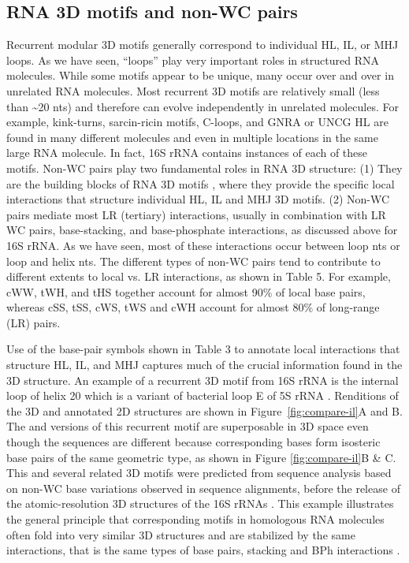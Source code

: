 \subsection{RNA 3D motifs and non-WC pairs}

Recurrent modular 3D motifs generally correspond to individual HL, IL, or MHJ
loops. As we have seen, ``loops'' play very important roles in structured RNA
molecules. While some motifs appear to be unique, many occur over and over in
unrelated RNA molecules. Most recurrent 3D motifs are relatively small (less
than \textasciitilde 20 nts) and therefore can evolve independently in unrelated molecules.
For example, kink-turns, sarcin-ricin motifs, C-loops, and GNRA or UNCG HL are
found in many different molecules and even in multiple locations in the same
large RNA molecule. In fact, 16S rRNA contains instances of each of these
motifs. Non-WC pairs play two fundamental roles in RNA 3D structure: (1) They
are the building blocks of RNA 3D motifs \cite{Leontis2006}, where they provide
the specific local interactions that structure individual HL, IL and MHJ 3D
motifs. (2) Non-WC pairs mediate most LR (tertiary) interactions, usually in
combination with LR WC pairs, base-stacking, and base-phosphate interactions, as
discussed above for 16S rRNA. As we have seen, most of these interactions occur
between loop nts or loop and helix nts. The different types of non-WC pairs tend
to contribute to different extents to local vs. LR interactions, as shown in
Table 5. For example, cWW, tWH, and tHS together account for almost 90\% of
local base pairs, whereas cSS, tSS, cWS, tWS and cWH account for almost 80\% of
long-range (LR) pairs. 

Use of the base-pair symbols shown in Table 3 to annotate local interactions
that structure HL, IL, and MHJ captures much of the crucial information found in
the 3D structure. An example of a recurrent 3D motif from 16S rRNA is the
internal loop of helix 20 which is a variant of bacterial loop E of 5S rRNA
\cite{Leontis1998a}. Renditions of the 3D and annotated 2D structures are shown
in Figure~\ref{fig:compare-il}A and B. The \EC{} and \TT{} versions of this
recurrent motif are superposable in 3D space even though the sequences are
different because corresponding bases form isosteric base pairs of the same
geometric type, as shown in Figure \ref{fig:compare-il}B \& C. This and several
related 3D motifs were predicted from sequence analysis based on non-WC base
variations observed in sequence alignments, before the release of the
atomic-resolution 3D structures of the 16S rRNAs \cite{Leontis1998,
Leontis2002e}. This example illustrates the general principle that corresponding
motifs in homologous RNA molecules often fold into very similar 3D structures
and are stabilized by the same interactions, that is the same types of base
pairs, stacking and BPh interactions \cite{Petrov2013}.

